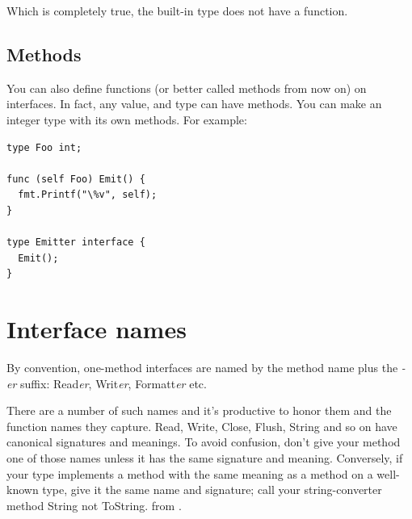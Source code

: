 \noindent{}

\noindent{}Which is completely true, the built-in type  does not
have a  function.

\subsection{Methods}
You can also define functions (or better called methods from now on) on
interfaces. In fact, any value, and type can have methods. 
You can make an integer type with its own methods. For example:
\begin{lstlisting}
type Foo int;

func (self Foo) Emit() {
  fmt.Printf("\%v", self);
}

type Emitter interface {
  Emit();
}
\end{lstlisting}

\section{Interface names}
By convention, one-method interfaces are named by the method name plus
the \emph{-er} suffix: Read\emph{er}, Writ\emph{er}, Formatt\emph{er} etc.

There are a number of such names and it's productive to honor them and
the function names they capture. Read, Write, Close, Flush, String and
so on have canonical signatures and meanings. To avoid confusion, don't
give your method one of those names unless it has the same signature and
meaning. Conversely, if your type implements a method with the same
meaning as a method on a well-known type, give it the same name and
signature; call your string-converter method String not ToString.
from \cite{effective_go}.


